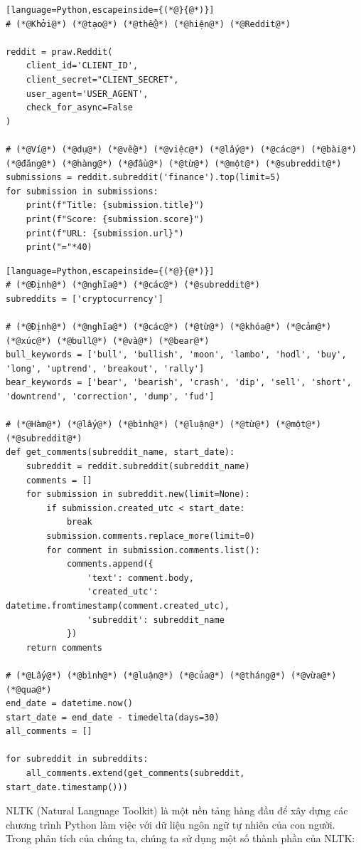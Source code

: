 \begin{lstlisting}[language=Python,escapeinside={(*@}{@*)}]
# (*@Khởi@*) (*@tạo@*) (*@thể@*) (*@hiện@*) (*@Reddit@*)

reddit = praw.Reddit(
    client_id='CLIENT_ID',
    client_secret="CLIENT_SECRET",
    user_agent='USER_AGENT',
    check_for_async=False
)

# (*@Ví@*) (*@dụ@*) (*@về@*) (*@việc@*) (*@lấy@*) (*@các@*) (*@bài@*) (*@đăng@*) (*@hàng@*) (*@đầu@*) (*@từ@*) (*@một@*) (*@subreddit@*)
submissions = reddit.subreddit('finance').top(limit=5)
for submission in submissions:
    print(f"Title: {submission.title}")
    print(f"Score: {submission.score}")
    print(f"URL: {submission.url}")
    print("="*40)
\end{lstlisting}

\begin{lstlisting}[language=Python,escapeinside={(*@}{@*)}]
# (*@Định@*) (*@nghĩa@*) (*@các@*) (*@subreddit@*)
subreddits = ['cryptocurrency']

# (*@Định@*) (*@nghĩa@*) (*@các@*) (*@từ@*) (*@khóa@*) (*@cảm@*) (*@xúc@*) (*@bull@*) (*@và@*) (*@bear@*)
bull_keywords = ['bull', 'bullish', 'moon', 'lambo', 'hodl', 'buy', 'long', 'uptrend', 'breakout', 'rally']
bear_keywords = ['bear', 'bearish', 'crash', 'dip', 'sell', 'short', 'downtrend', 'correction', 'dump', 'fud']

# (*@Hàm@*) (*@lấy@*) (*@bình@*) (*@luận@*) (*@từ@*) (*@một@*) (*@subreddit@*)
def get_comments(subreddit_name, start_date):
    subreddit = reddit.subreddit(subreddit_name)
    comments = []
    for submission in subreddit.new(limit=None):
        if submission.created_utc < start_date:
            break
        submission.comments.replace_more(limit=0)
        for comment in submission.comments.list():
            comments.append({
                'text': comment.body,
                'created_utc': datetime.fromtimestamp(comment.created_utc),
                'subreddit': subreddit_name
            })
    return comments

# (*@Lấy@*) (*@bình@*) (*@luận@*) (*@của@*) (*@tháng@*) (*@vừa@*) (*@qua@*)
end_date = datetime.now()
start_date = end_date - timedelta(days=30)
all_comments = []

for subreddit in subreddits:
    all_comments.extend(get_comments(subreddit, start_date.timestamp()))
\end{lstlisting}

NLTK (Natural Language Toolkit) là một nền tảng hàng đầu để xây dựng các chương trình Python làm việc với dữ liệu ngôn ngữ tự nhiên của con người. Trong phân tích của chúng ta, chúng ta sử dụng một số thành phần của NLTK:

